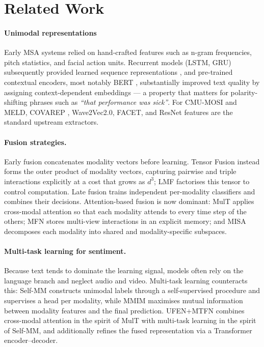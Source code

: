 \documentclass[11pt,twocolumn]{article}
\begin{document}
\section{Related Work}
\label{sec:related}

\paragraph{Unimodal representations} Early MSA systems relied on hand-crafted features such as n-gram frequencies, pitch statistics, and facial action units. Recurrent models (LSTM, GRU) subsequently provided learned sequence representations \citep{poria2017review}, and pre-trained contextual encoders, most notably BERT \citep{devlin2019bert}, substantially improved text quality by assigning context-dependent embeddings --- a property that matters for polarity-shifting phrases such as \emph{``that performance was sick''}. For CMU-MOSI and MELD, COVAREP \citep{degottex2014covarep}, Wave2Vec2.0, FACET, and ResNet features are the standard upstream extractors.

\paragraph{Fusion strategies.} Early fusion concatenates modality vectors before learning. Tensor Fusion \citep{zadeh2017tensor} instead forms the outer product of modality vectors, capturing pairwise and triple interactions explicitly at a cost that grows as $d^3$; LMF \citep{liu2018efficient} factorises this tensor to control computation. Late fusion trains independent per-modality classifiers and combines their decisions. Attention-based fusion is now dominant: MulT \citep{tsai2019multimodal} applies cross-modal attention so that each modality attends to every time step of the others; MFN \citep{zadeh2018memory} stores multi-view interactions in an explicit memory; and MISA \citep{hazarika2021misa} decomposes each modality into shared and modality-specific subspaces.

\paragraph{Multi-task learning for sentiment.} Because text tends to dominate the learning signal, models often rely on the language branch and neglect audio and video. Multi-task learning counteracts this: Self-MM \citep{yu2021selfmm} constructs unimodal labels through a self-supervised procedure and supervises a head per modality, while MMIM \citep{han2021improving} maximises mutual information between modality features and the final prediction. UFEN+MTFN \citep{cai2025multimodal} combines cross-modal attention in the spirit of MulT with multi-task learning in the spirit of Self-MM, and additionally refines the fused representation via a Transformer encoder--decoder.
\end{document}
